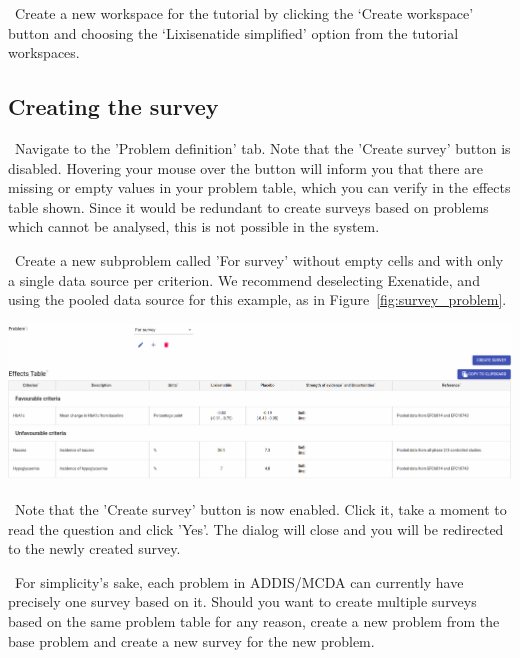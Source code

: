 \documentclass[00_mcda_tutorial.tex]{subfiles}
\begin{document}
\begin{sidebar*}
\noindent \leftpointright \, Create a new workspace for the tutorial by clicking the ‘Create workspace’ button and choosing the ‘Lixisenatide simplified’ option from the tutorial workspaces.
\newline

\subsection*{Creating the survey}
\noindent \leftpointright \, Navigate to the 'Problem definition' tab.  Note that the 'Create survey' button is disabled. Hovering your mouse over the button will inform you that there are missing or empty values in your problem table, which you can verify in the effects table shown. Since it would be redundant to create surveys based on problems which cannot be analysed, this is not possible in the system.
\newline

\noindent \leftpointright \, Create a new subproblem called 'For survey' without empty cells and with only a single data source per criterion. We recommend deselecting Exenatide, and using the pooled data source for this example, as in Figure~\ref{fig:survey_problem}.
\newline

{	
	\centering
	\includegraphics[width=\textwidth]{fig/surveyProblem.png}
	\label{fig:survey_problem}
	\par
}

\noindent \leftpointright \, Note that the 'Create survey' button is now enabled. Click it, take a moment to read the question and click 'Yes'. The dialog will close and you will be redirected to the newly created survey.
\newline

\noindent \faLightbulbO \, For simplicity's sake, each problem in ADDIS/MCDA can currently have precisely one survey based on it. Should you want to create multiple surveys based on the same problem table for any reason, create a new problem from the base problem and create a new survey for the new problem.


\end{sidebar*}
\end{document}
